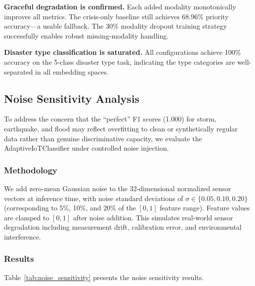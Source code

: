 \documentclass[journal]{IEEEtran}
\begin{document}
\textbf{Graceful degradation is confirmed.} Each added modality monotonically improves all metrics. The crisis-only baseline still achieves 68.96\% priority accuracy---a usable fallback. The 30\% modality dropout training strategy successfully enables robust missing-modality handling.

\textbf{Disaster type classification is saturated.} All configurations achieve 100\% accuracy on the 5-class disaster type task, indicating the type categories are well-separated in all embedding spaces.

\subsection{Noise Sensitivity Analysis}
\label{sec:noise_sensitivity}

To address the concern that the ``perfect'' F1 scores (1.000) for storm, earthquake, and flood may reflect overfitting to clean or synthetically regular data rather than genuine discriminative capacity, we evaluate the AdaptiveIoTClassifier under controlled noise injection.

\subsubsection{Methodology}

We add zero-mean Gaussian noise to the 32-dimensional normalized sensor vectors at inference time, with noise standard deviations of $\sigma \in \{0.05, 0.10, 0.20\}$ (corresponding to 5\%, 10\%, and 20\% of the $[0, 1]$ feature range). Feature values are clamped to $[0, 1]$ after noise addition. This simulates real-world sensor degradation including measurement drift, calibration error, and environmental interference.

\subsubsection{Results}

Table~\ref{tab:noise_sensitivity} presents the noise sensitivity results.
\end{document}

